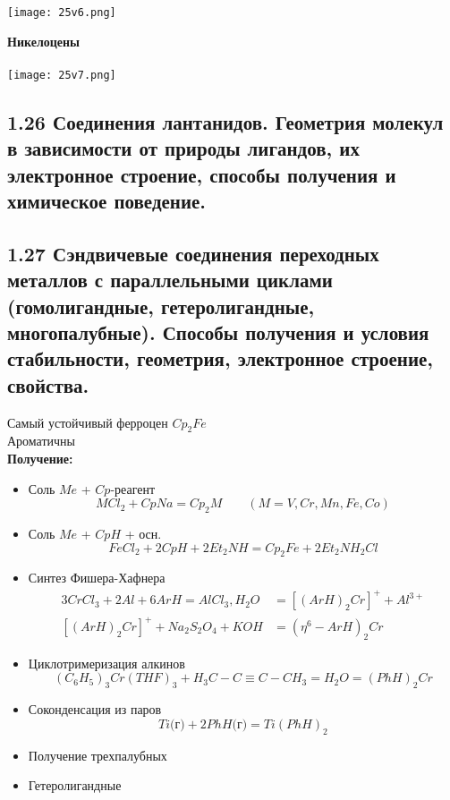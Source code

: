 \texttt{[image: 25v6.png]}

\textbf{Никелоцены}\\
\\

\texttt{[image: 25v7.png]}

\subsection{1.26 Соединения лантанидов. Геометрия молекул в зависимости от природы лигандов, их электронное строение, способы получения и химическое поведение.}

\subsection{1.27 Сэндвичевые соединения переходных металлов с параллельными циклами (гомолигандные, гетеролигандные, многопалубные). Способы получения и условия стабильности, геометрия, электронное строение, свойства.}
\begin{figure} [H]
	\centering {\texttt{[image: xx1]}}
\end{figure}
Самый устойчивый ферроцен $Cp_2Fe$ \\
Ароматичны \\
\textbf{Получение:}\\
\begin{itemize}
	\item Соль $Me$ + $Cp$-реагент
	\[
	MCl_2 + CpNa = Cp_2M \qquad (M = V, Cr, Mn, Fe, Co)
	\]
	\item Соль $Me$ + $CpH$ + осн.
	\[
	FeCl_2 + 2CpH + 2Et_2NH = Cp_2Fe + 2Et_2NH_2Cl
	\]
	\item Синтез Фишера-Хафнера
	\begin{align*}
	3CrCl_3 + 2Al + 6ArH = AlCl_3, H_2O &= \left[(ArH)_2 Cr \right]^{+} + Al^{3+} \\
	\left[(ArH)_2 Cr \right]^{+} + Na_2S_2O_4 + KOH &= (\eta^6 - ArH)_2Cr 
	\end{align*}
	\item Циклотримеризация алкинов
	\[
	(C_6H_5)_3Cr(THF)_3 + H_3C-C\equiv C-CH_3 = H_2O = (PhH)_2Cr
	\]
	\item Соконденсация из паров
	\[
	Ti\text{(г)} + 2PhH \text{(г)} = Ti(PhH)_2
	\]
	\item Получение трехпалубных 
	\begin{figure} [H]
		\centering {\texttt{[image: xx2]}}
	\end{figure}
	\item Гетеролигандные
	\begin{figure} [H]
		\centering {\texttt{[image: xx3]}}
	\end{figure}
\end{itemize}

